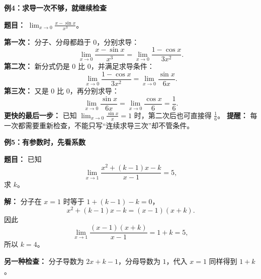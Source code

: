 \begin{examplebox}
\medskip
\textbf{\textcolor{CExample}{例4：求导一次不够，就继续检查}}

\textbf{题目：} $\displaystyle\lim_{x\to0}\frac{x-\sin x}{x^3}$。

\textbf{第一次：} 分子、分母都趋于 $0$，分别求导：
\[
\lim_{x\to0}\frac{x-\sin x}{x^3}
=\lim_{x\to0}\frac{1-\cos x}{3x^2}.
\]
\textbf{第二次：} 新分式仍是 $0$ 比 $0$，并满足求导条件：
\[
\lim_{x\to0}\frac{1-\cos x}{3x^2}
=\lim_{x\to0}\frac{\sin x}{6x}.
\]
\textbf{第三次：} 又是 $0$ 比 $0$，再分别求导：
\[
\lim_{x\to0}\frac{\sin x}{6x}
=\lim_{x\to0}\frac{\cos x}{6}
=\boxed{\frac16}.
\]
\textbf{更快的最后一步：} 已知 $\lim_{x\to0}\frac{\sin x}{x}=1$ 时，第二次后也可直接得 $\frac16$。
\textbf{提醒：} 每一次都需要重新检查，不能只写“连续求导三次”却不管条件。

\medskip
\textbf{\textcolor{CExample}{例5：有参数时，先看系数}}

\textbf{题目：} 已知
\[
\lim_{x\to1}\frac{x^2+(k-1)x-k}{x-1}=5,
\]
求 $k$。

\textbf{解：} 分子在 $x=1$ 时等于 $1+(k-1)-k=0$，
\[
 x^2+(k-1)x-k=(x-1)(x+k).
\]
因此
\[
\lim_{x\to1}\frac{(x-1)(x+k)}{x-1}=1+k=5,
\]
所以 $\boxed{k=4}$。

\textbf{另一种检查：} 分子导数为 $2x+k-1$，分母导数为 $1$，代入 $x=1$ 同样得到 $1+k$。
\end{examplebox}

